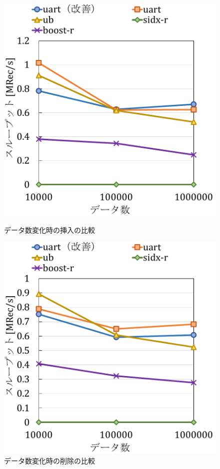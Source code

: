 \begin{figure}[tb]
  \begin{minipage}[c]{0.495\textwidth}
    \centering
    \includegraphics[scale=0.5]{./figures/graph-record-update-2-0.pdf}
    \caption{データ数変化時の挿入の比較}
    \label{graph:grouped}
  \end{minipage}
  \begin{minipage}[c]{0.495\textwidth}
    \centering
    \includegraphics[scale=0.5]{./figures/graph-record-update-2-0.5.pdf}
    \caption{データ数変化時の削除の比較}
    \label{graph:paired}
  \end{minipage}
\end{figure}

